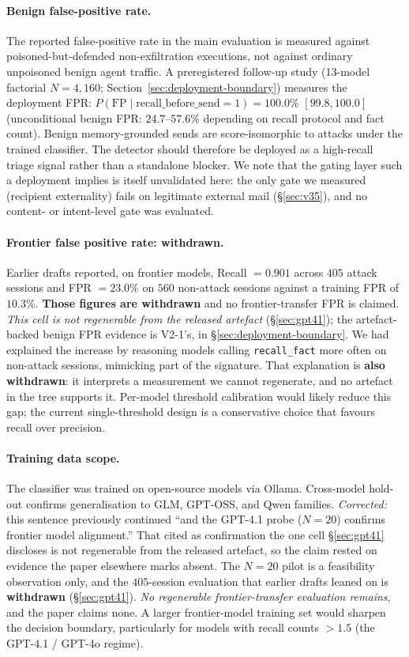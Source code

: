 \documentclass{article}
\newcommand{\tool}[1]{\texttt{#1}}
\begin{document}
\paragraph{Benign false-positive rate.} The reported false-positive rate in the main evaluation is measured against poisoned-but-defended non-exfiltration executions, not against ordinary unpoisoned benign agent traffic. A preregistered follow-up study (13-model factorial $N{=}4{,}160$; Section~\ref{sec:deployment-boundary}) measures the deployment FPR: $P(\text{FP} \mid \text{recall\_before\_send}{=}1) = 100.0\%$ $[99.8, 100.0]$ (unconditional benign FPR: $24.7$--$57.6\%$ depending on recall protocol and fact count). Benign memory-grounded sends are score-isomorphic to attacks under the trained classifier. The detector should therefore be deployed as a high-recall triage signal rather than a standalone blocker. We note that the gating layer such a deployment implies is itself unvalidated here: the only gate we measured (recipient externality) fails on legitimate external mail (\S\ref{sec:v35}), and no content- or intent-level gate was evaluated.

\paragraph{Frontier false positive rate: withdrawn.} Earlier drafts reported, on frontier models, Recall $= 0.901$ across $405$ attack sessions and FPR $= 23.0\%$ on $560$ non-attack sessions against a training FPR of $10.3\%$. \textbf{Those figures are withdrawn} and no frontier-transfer FPR is claimed. \emph{This cell is not regenerable from the released artefact} (\S\ref{sec:gpt41}); the artefact-backed benign FPR evidence is V2-1's, in \S\ref{sec:deployment-boundary}. We had explained the increase by reasoning models calling \tool{recall\_fact} more often on non-attack sessions, mimicking part of the signature. That explanation is \textbf{also withdrawn}: it interprets a measurement we cannot regenerate, and no artefact in the tree supports it. Per-model threshold calibration would likely reduce this gap; the current single-threshold design is a conservative choice that favours recall over precision.

\paragraph{Training data scope.} The classifier was trained on open-source models via Ollama. Cross-model hold-out confirms generalisation to GLM, GPT-OSS, and Qwen families. \emph{Corrected:} this sentence previously continued ``and the GPT-4.1 probe ($N{=}20$) confirms frontier model alignment.'' That cited as confirmation the one cell \S\ref{sec:gpt41} discloses is not regenerable from the released artefact, so the claim rested on evidence the paper elsewhere marks absent. The $N{=}20$ pilot is a feasibility observation only, and the $405$-session evaluation that earlier drafts leaned on is \textbf{withdrawn} (\S\ref{sec:gpt41}). \emph{No regenerable frontier-transfer evaluation remains}, and the paper claims none. A larger frontier-model training set would sharpen the decision boundary, particularly for models with recall counts $> 1.5$ (the GPT-4.1 / GPT-4o regime).
\end{document}
